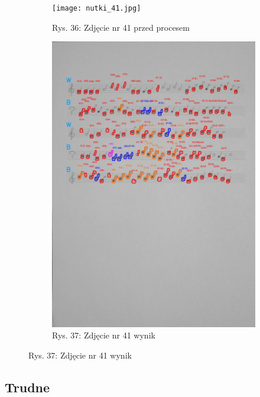 \documentclass[11pt]{article}
\begin{document}
\begin{figure}
\begin{subfigure}[b]{0.475\textwidth}
        \texttt{[image: nutki\_41.jpg]}
        \caption[]%
        {{\small Rys. 36: Zdjęcie nr 41 przed procesem}}
        \label{fig:sub3}
    \end{subfigure}
    \quad
    \begin{subfigure}[b]{0.475\textwidth}
        \centering
        \graphicspath{ {blobs/} }
        \includegraphics[width=\textwidth]{41_cnts.jpg}
        \caption[]%
        {{\small Rys. 37: Zdjęcie nr 41 wynik}}
        \label{fig:sub 4}
    \end{subfigure}
    \label{fig 4}
\end{figure}

\FloatBarrier

\subsection{Trudne}
\end{document}

